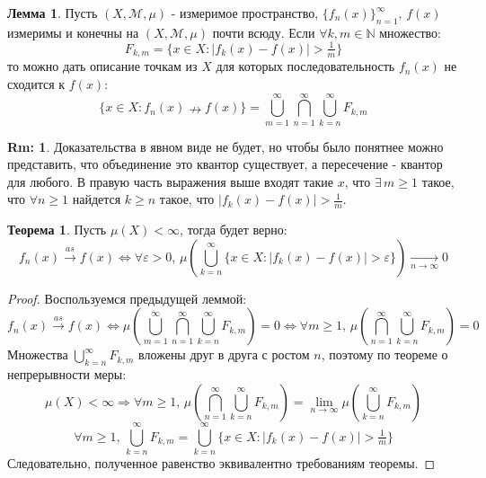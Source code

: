 \documentclass[12pt]{article}
\newcommand{\MN}{\mathbb{N}}
\newcommand{\MM}{\mathcal{M}}
\newcommand{\VE}{\varepsilon}
\theoremstyle{definition}
\newtheorem{rem}{Rm:}
\newtheorem{lemma}{Лемма}
\newtheorem{theorem}{Теорема}
\begin{document}
\begin{lemma}
	Пусть $(X,\MM,\mu)$ - измеримое пространство, $\{f_n(x)\}_{n = 1}^{\infty}, \, f(x)$ измеримы и конечны на $(X,\MM,\mu)$ почти всюду. Если $\forall k,m \in \MN$ множество:
	$$
		F_{k,m} = \{x \in X \colon |f_k(x) -f(x)| > \tfrac{1}{m}\}
	$$
	то можно дать описание точкам из $X$ для которых последовательность $f_n(x)$ не сходится к $f(x)$:
	$$
		\{x \in X \colon f_n(x) \nrightarrow f(x)\} = \bigcup\limits_{m = 1}^{\infty}\bigcap\limits_{n = 1}^{\infty}\bigcup\limits_{k = n}^{\infty}F_{k,m}
	$$
\end{lemma}
\begin{rem}
	Доказательства в явном виде не будет, но чтобы было понятнее можно представить, что объединение это квантор существует, а пересечение - квантор для любого. В правую часть выражения выше входят такие $x$, что $\exists \, m \geq 1$ такое, что $\forall n \geq 1$ найдется $k \geq n$ такое, что $|f_k(x) -f(x)| > \tfrac{1}{m}$.
\end{rem}

\begin{theorem}
	Пусть $\mu(X) < \infty$, тогда будет верно: 
	$$
		f_n(x) \xrightarrow{as} f(x) \Leftrightarrow \forall \VE > 0, \, \mu\left(\bigcup\limits_{k = n}^{\infty}\{x \in X \colon |f_k(x) - f(x)| > \VE\}\right) \xrightarrow[n \to \infty]{} 0
	$$
\end{theorem}
\begin{proof}
	Воспользуемся предыдущей леммой:
	$$
		f_n(x) \xrightarrow{as} f(x) \Leftrightarrow\mu\left(\bigcup\limits_{m = 1}^{\infty}\bigcap\limits_{n = 1}^{\infty}\bigcup\limits_{k = n}^{\infty}F_{k,m}\right) = 0 \Leftrightarrow \forall m \geq 1, \, \mu\left(\bigcap\limits_{n = 1}^{\infty}\bigcup\limits_{k = n}^{\infty}F_{k,m}\right) = 0
	$$
	Множества $\bigcup\limits_{k = n}^{\infty}F_{k,m}$ вложены друг в друга с ростом $n$, поэтому по теореме о непрерывности меры:
	$$
		\mu(X) < \infty \Rightarrow \forall m\geq 1 , \, \mu\left(\bigcap\limits_{n = 1}^{\infty}\bigcup\limits_{k = n}^{\infty}F_{k,m}\right) = \lim\limits_{n \to \infty}\mu\left(\bigcup\limits_{k = n}^{\infty}F_{k,m}\right)
	$$
	$$
		\forall m \geq 1, \, \bigcup\limits_{k = n}^{\infty}F_{k,m} = \bigcup\limits_{k = n}^{\infty}\{x \in X \colon |f_k(x) - f(x)| > \tfrac{1}{m}\}
	$$
	Следовательно, полученное равенство эквивалентно требованиям теоремы.
\end{proof}
\end{document}
